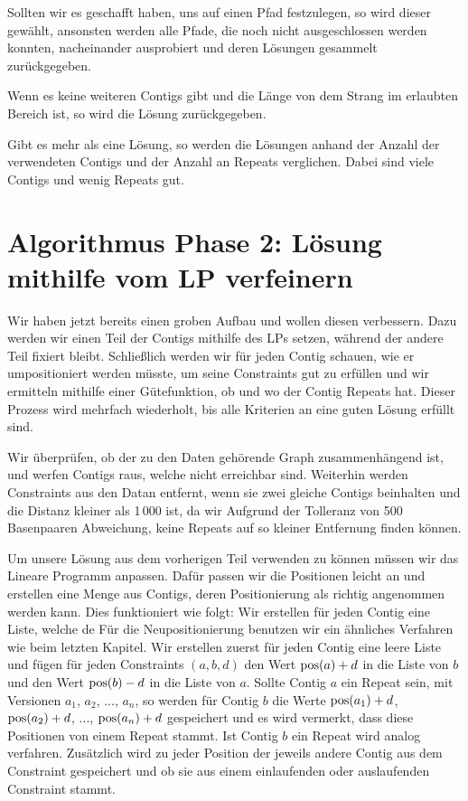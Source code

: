 Sollten wir es geschafft haben, uns auf einen Pfad festzulegen, so wird dieser gewählt, ansonsten werden alle Pfade, die noch nicht ausgeschlossen werden konnten, nacheinander ausprobiert und deren Lösungen gesammelt zurückgegeben.

Wenn es keine weiteren Contigs gibt und die Länge von dem Strang im erlaubten Bereich ist, so wird die Lösung zurückgegeben.

Gibt es mehr als eine Lösung, so werden die Lösungen anhand der Anzahl der verwendeten Contigs und der Anzahl an Repeats verglichen. 
Dabei sind viele Contigs und wenig Repeats gut.





\section{Algorithmus Phase 2: Lösung mithilfe vom LP verfeinern}
Wir haben jetzt bereits einen groben Aufbau und wollen diesen verbessern. Dazu werden wir einen Teil der Contigs mithilfe des LPs setzen, während der andere Teil fixiert bleibt. Schließlich werden wir für jeden Contig schauen, wie er umpositioniert werden müsste, um seine Constraints gut zu erfüllen und wir ermitteln mithilfe einer Gütefunktion, ob und wo der Contig Repeats hat. Dieser Prozess wird mehrfach wiederholt, bis alle Kriterien an eine guten Lösung erfüllt sind.

Wir überprüfen, ob der zu den Daten gehörende Graph zusammenhängend ist, und werfen Contigs raus, welche nicht erreichbar sind. Weiterhin werden Constraints aus den Datan entfernt, wenn sie zwei gleiche Contigs beinhalten und die Distanz kleiner als 1\,000 ist, da wir Aufgrund der Tolleranz von 500 Basenpaaren Abweichung, keine Repeats auf so kleiner Entfernung finden können.

Um unsere Lösung aus dem vorherigen Teil verwenden zu können müssen wir das Lineare Programm anpassen. Dafür passen wir die Positionen leicht an und erstellen eine Menge aus Contigs, deren Positionierung als richtig angenommen werden kann. Dies funktioniert wie folgt:
Wir erstellen für jeden Contig eine Liste, welche de
Für die Neupositionierung benutzen wir ein ähnliches Verfahren wie beim letzten Kapitel. Wir erstellen zuerst für jeden Contig eine leere Liste
und fügen für jeden Constraints $(a,b,d)$ den Wert $\operatorname*{pos}(a)+d$ in die Liste von $b$ und den Wert $\operatorname*{pos}(b)-d$ in die Liste von $a$. Sollte Contig $a$ ein Repeat sein, mit Versionen $a_1$, $a_2$, ..., $a_n$, so werden für Contig $b$ die Werte $\operatorname*{pos}(a_1)+d$, $\operatorname*{pos}(a_2)+d$, ..., $\operatorname*{pos}(a_n)+d$ gespeichert und es wird vermerkt, dass diese Positionen von einem Repeat stammt. 
Ist Contig $b$ ein Repeat wird analog verfahren.
Zusätzlich wird zu jeder Position der jeweils andere Contig aus dem Constraint gespeichert und ob sie aus einem einlaufenden oder auslaufenden Constraint stammt.

